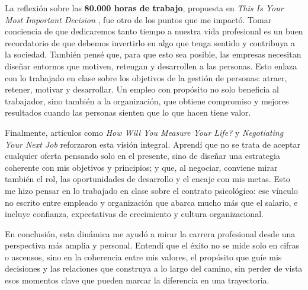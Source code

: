 La reflexión sobre las \textbf{80.000 horas de trabajo}, propuesta en \emph{This Is Your Most Important Decision} \cite{80000hours}, fue otro de los puntos que me impactó. Tomar conciencia de que dedicaremos tanto tiempo a nuestra vida profesional es un buen recordatorio de que debemos invertirlo en algo que tenga sentido y contribuya a la sociedad. También pensé que, para que esto sea posible, las empresas necesitan diseñar entornos que motiven, retengan y desarrollen a las personas. Esto enlaza con lo trabajado en clase sobre los objetivos de la gestión de personas: atraer, retener, motivar y desarrollar. Un empleo con propósito no solo beneficia al trabajador, sino también a la organización, que obtiene compromiso y mejores resultados cuando las personas sienten que lo que hacen tiene valor.

Finalmente, artículos como \emph{How Will You Measure Your Life?} \cite{christensen-measure-life} y \emph{Negotiating Your Next Job} \cite{hbr-negotiating-next-job} reforzaron esta visión integral. Aprendí que no se trata de aceptar cualquier oferta pensando solo en el presente, sino de diseñar una estrategia coherente con mis objetivos y principios; y que, al negociar, conviene mirar también el rol, las oportunidades de desarrollo y el encaje con mis metas. Esto me hizo pensar en lo trabajado en clase sobre el contrato psicológico: ese vínculo no escrito entre empleado y organización que abarca mucho más que el salario, e incluye confianza, expectativas de crecimiento y cultura organizacional.  

En conclusión, esta dinámica me ayudó a mirar la carrera profesional desde una perspectiva más amplia y personal. Entendí que el éxito no se mide solo en cifras o ascensos, sino en la coherencia entre mis valores, el propósito que guíe mis decisiones y las relaciones que construya a lo largo del camino, sin perder de vista esos momentos clave que pueden marcar la diferencia en una trayectoria. 
